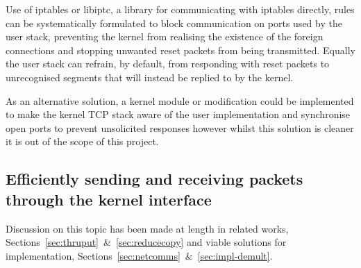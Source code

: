 \documentclass[11pt,a4paper,british]{bhamarticle}
\begin{document}
\begin{multicols}{2}
Use of iptables or libiptc, a library for communicating with iptables directly, rules can be systematically formulated to block communication on ports used by the user stack, preventing the kernel from realising the existence of the foreign connections and stopping unwanted reset packets from being transmitted. Equally the user stack can refrain, by default, from responding with reset packets to unrecognised segments that will instead be replied to by the kernel.

As an alternative solution, a kernel module or modification could be implemented to make the kernel TCP stack aware of the user implementation and synchronise open ports to prevent unsolicited responses however whilst this solution is cleaner it is out of the scope of this project.

\subsection{Efficiently sending and receiving packets through the kernel interface}
Discussion on this topic has been made at length in related works, Sections~\ref{sec:thruput}~\&~\ref{sec:reducecopy} and viable solutions for implementation, Sections~\ref{sec:netcomms}~\&~\ref{sec:impl-demult}.


\printbibliography %
\end{multicols}
\end{document}
